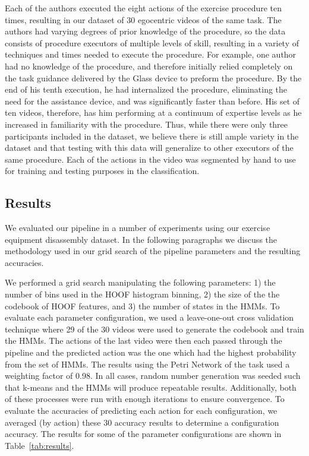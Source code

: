 \documentclass[10pt,twocolumn,letterpaper]{article}
\begin{document}
Each of the authors executed the eight actions of the exercise procedure ten times, resulting in our dataset of 30 egocentric videos of the same task. The authors had varying degrees of prior knowledge of the procedure, so the data consists of procedure executors of multiple levels of skill, resulting in a variety of techniques and times needed to execute the procedure. For example, one author had no knowledge of the procedure, and therefore initially relied completely on the task guidance delivered by the Glass device to preform the procedure. By the end of his tenth execution, he had internalized the procedure, eliminating the need for the assistance device, and was significantly faster than before. His set of ten videos, therefore, has him performing at a continuum of expertise levels as he increased in familiarity with the procedure. Thus, while there were only three participants included in the dataset, we believe there is still ample variety in the dataset and that testing with this data will generalize to other executors of the same procedure. Each of the actions in the video was segmented by hand to use for training and testing purposes in the classification.

\subsection{Results}

We evaluated our pipeline in a number of experiments using our exercise equipment disassembly dataset. In the following paragraphs we discuss the methodology used in our grid search of the pipeline parameters and the resulting accuracies.

We performed a grid search manipulating the following parameters: 1) the number of bins used in the HOOF histogram binning, 2) the size of the the codebook of HOOF features, and 3) the number of states in the HMMs. To evaluate each parameter configuration, we used a leave-one-out cross validation technique where 29 of the 30 videos were used to generate the codebook and train the HMMs. The actions of the last video were then each passed through the pipeline and the predicted action was the one which had the highest probability from the set of HMMs. The results using the Petri Network of the task used a weighting factor of 0.98. In all cases, random number generation was seeded such that k-means and the HMMs will produce repeatable results. Additionally, both of these processes were run with enough iterations to ensure convergence. To evaluate the accuracies of predicting each action for each configuration, we averaged (by action) these 30 accuracy results to determine a configuration accuracy. The results for some of the parameter configurations are shown in Table~\ref{tab:results}.
 
\end{document}

